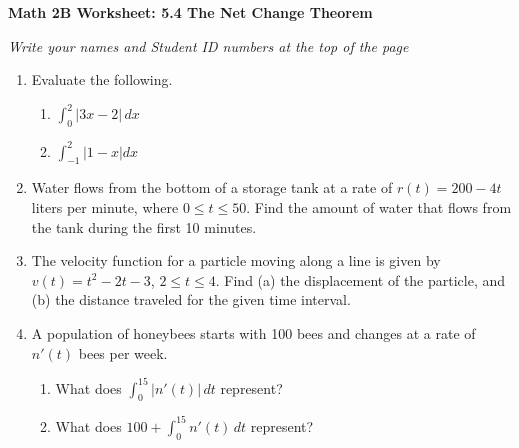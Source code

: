 \documentclass[12pt,fleqn]{article}
\begin{document}
\begin{center}
	\textbf{Math 2B Worksheet: 5.4 The Net Change Theorem}
\end{center}

\emph{Write your names and Student ID numbers at the top of the page}

\begin{enumerate}
\item Evaluate the following.
\begin{enumerate}
\item $\displaystyle \int_0^2 |3x-2|\,dx$\\[100pt]

\item $\displaystyle \int_{-1}^2|1-x|dx$
\end{enumerate}

\vspace{100pt}

\item Water flows from the bottom of a storage tank at a rate of $r(t)=200-4t$ liters per minute, where $0\leq t\leq 50$.  Find the amount of water that flows from the tank during the first 10 minutes.

\newpage

\item The velocity function for a particle moving along a line is given by $v(t)=t^2-2t-3$, $2\leq t\leq 4$.  Find (a) the displacement of the particle, and (b) the distance traveled for the given time interval.

\vfill\vfill

\item A population of honeybees starts with 100 bees and changes at a rate of $n'(t)$ bees per week.  
\begin{enumerate}
	\item What does $\displaystyle\int_0^{15} |n'(t)|\,dt$ represent?\\[60pt]

	\item What does $100+\displaystyle\int_0^{15}n'(t)\,dt$ represent?
\end{enumerate}
\end{enumerate}

\vfill
\end{document}
